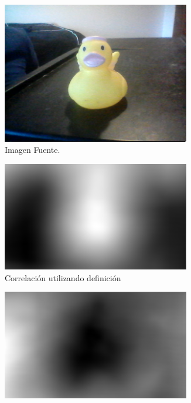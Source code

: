 \begin{figure}[H]
\centering
	\begin{subfigure}{.4\textwidth}
		\centering
		\includegraphics[width=0.9\textwidth]{Imagenes/Original.png}
		\caption{Imagen Fuente.}
		\label{fig:original}
	\end{subfigure}
	\begin{subfigure}{.4\textwidth}
		\centering
		\includegraphics[width=0.9\textwidth]{Imagenes/Correlation.png}
		\caption{Correlación utilizando definición}
		\label{fig:corr}
	\end{subfigure}
		\begin{subfigure}{.4\textwidth}
		\centering
		\includegraphics[width=0.9\textwidth]{Imagenes/SQDIFF.png}

\end{subfigure}
\end{figure}

